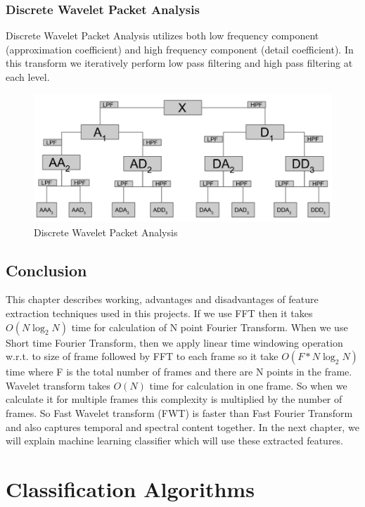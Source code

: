 \documentclass[11pt]{report}
\begin{document}
\newpage
\subsection{Discrete Wavelet Packet Analysis}
Discrete Wavelet Packet Analysis utilizes both low frequency component (approximation coefficient) and high frequency component (detail coefficient). In this transform we iteratively perform low pass filtering and high pass filtering at each level.

\begin{figure}[h]
\centering
\includegraphics[scale=.5]{./images/dwpa.png}
\caption{Discrete Wavelet Packet Analysis}
\end{figure}

\section{Conclusion}
This chapter describes working, advantages and disadvantages of feature extraction techniques used in this projects. If we use FFT then it takes $O(N\log_{2}N)$ time for calculation of N point Fourier Transform. When we use Short time Fourier Transform, then we apply linear time windowing operation  w.r.t. to size of frame followed by FFT to each frame so it take $O(F*N\log_{2}N)$ time where F is the total number of frames and there are N points in the frame. Wavelet transform takes $O(N)$ time for calculation in one frame. So when we calculate it for multiple frames this complexity is multiplied by the number of frames. So Fast Wavelet transform (FWT) is faster than Fast Fourier Transform and also captures temporal and spectral content together. In the next chapter, we will explain machine learning classifier which will use these extracted features.



\chapter{Classification Algorithms}
\end{document}
